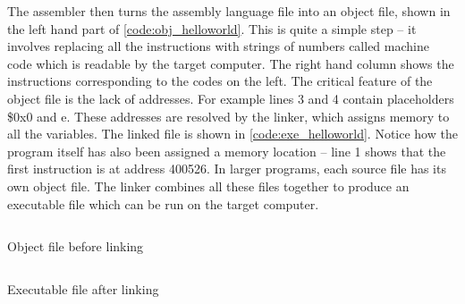 The assembler then turns the assembly language file into an object file, shown in the left hand part of \autoref{code:obj_helloworld}. This is quite a simple step -- it involves replacing all the instructions with strings of numbers called machine code which is readable by the target computer. The right hand column shows the instructions corresponding to the codes on the left. The critical feature of the object file is the lack of addresses. For example lines 3 and 4 contain placeholders \$0x0 and e. These addresses are resolved by the linker, which assigns memory to all the variables. The linked file is shown in \autoref{code:exe_helloworld}. Notice how the program itself has also been assigned a memory location -- line 1 shows that the first instruction is at address 400526. In larger programs, each source file has its own object file. The linker combines all these files together to produce an executable file which can be run on the target computer.

\begin{listing}[H]
   \inputminted[firstline=40, lastline=46]{gas}{code/asm/c_helloworld.x86_64obj.txt}
   \caption{Object file before linking}
   \label{code:obj_helloworld}
\end{listing}

\begin{listing}
   \inputminted[firstline=137, lastline=143]{gas}{code/asm/c_helloworld.x86_64obj.txt}
   \caption{Executable file after linking}
   \label{code:exe_helloworld}
\end{listing}

